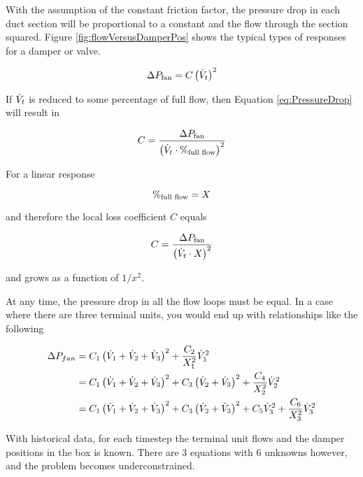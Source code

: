 With the assumption of the constant friction factor, the pressure drop in each duct section will be proportional to a constant and the flow through the section squared. Figure \ref{fig:flowVersusDamperPos} shows the typical types of responses for a damper or valve.

\begin{equation}\label{eq:PressureDrop}
    \Delta P_{\text{fan}} = C\left(\dot{V}_{t}\right)^2
\end{equation}

 If \(\dot{V}_{t}\) is reduced to some percentage of full flow, then Equation \ref{eq:PressureDrop} will result in

 \begin{equation}
     C = \frac{\Delta P_{\text{fan}}}{\left( \dot{V}_{t} \cdot \%_{\text{full flow}} \right)^2}
 \end{equation}
 
For a linear response

\begin{equation}
    \%_{\text{full flow}} = X_{}
\end{equation}

and therefore the local loss coefficient \(C\) equals


\begin{equation}
C = \frac{\Delta P_{\text{fan}}}{\left( \dot{V}_{t} \cdot X_{}  \right)^2}
\end{equation}

and grows as a function of \(1/x^2\). 


At any time, the pressure drop in all the flow loops must be equal. In a case where there are three terminal units, you would end up with relationships like the following

\begin{align}
    \Delta P_{fan}  &= C_1 \left(\dot{V}_{1}+\dot{V}_{2}+\dot{V}_{3} \right)^2 + \frac{C_2}{X_{1}^2}\dot{V}_{1}^2 \\
                    &= C_1 \left(\dot{V}_{1}+\dot{V}_{2}+\dot{V}_{3} \right)^2 + C_3\left(\dot{V}_{2}+\dot{V}_{3} \right)^2 + \frac{C_4}{X_{2}^2}\dot{V}_{2}^2 \\
                    &= C_1 \left(\dot{V}_{1}+\dot{V}_{2}+\dot{V}_{3} \right)^2 + C_3\left(\dot{V}_{2}+\dot{V}_{3} \right)^2 + C_5\dot{V}_{3}^2 + \frac{C_6}{X_{3}^2}\dot{V}_{3}^2 
\end{align}

With historical data, for each timestep the terminal unit flows and the damper positions in the box is known. There are 3 equations with 6 unknowns however, and the problem becomes underconstrained. 

